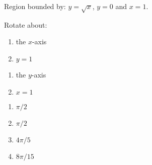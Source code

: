 {Region bounded by: $y=\sqrt{x}$, $y=0$ and $x=1$.

Rotate about:

\noindent%
\begin{minipage}[t]{.5\linewidth}
\begin{enumerate}
\item		the $x$-axis
\item		$y=1$
\end{enumerate}
\end{minipage}
\begin{minipage}[t]{.5\linewidth}
\begin{enumerate}\addtocounter{enumii}{2}
\item		the $y$-axis
\item		$x=1$
\end{enumerate}
\end{minipage}
}
{\begin{enumerate}
\item $\pi/2$
\item $\pi/2$
\item $4\pi/5$
\item $8\pi/15$
\end{enumerate}
}
